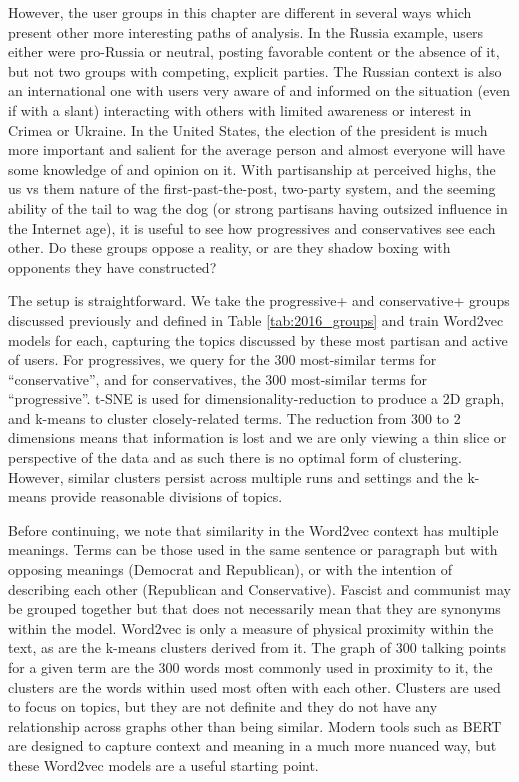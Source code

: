 \documentclass[doublespacing]{utdthesis}
\begin{document}
However, the user groups in this chapter are different in several ways which present other more interesting paths of analysis.
In the Russia example, users either were pro-Russia or neutral, posting favorable content or the absence of it, but not two groups with competing, explicit parties.
The Russian context is also an international one with users very aware of and informed on the situation (even if with a slant) interacting with others with limited awareness or interest in Crimea or Ukraine.
In the United States, the election of the president is much more important and salient for the average person and almost everyone will have some knowledge of and opinion on it.
With partisanship at perceived highs, the us vs them nature of the first-past-the-post, two-party system, and the seeming ability of the tail to wag the dog (or strong partisans having outsized influence in the Internet age), it is useful to see how progressives and conservatives see each other.
Do these groups oppose a reality, or are they shadow boxing with opponents they have constructed?

The setup is straightforward.
We take the progressive+ and conservative+ groups discussed previously and defined in Table \ref{tab:2016_groups} and train Word2vec models for each, capturing the topics discussed by these most partisan and active of users.
For progressives, we query for the 300 most-similar terms for ``conservative'', and for conservatives, the 300 most-similar terms for ``progressive''.
t-SNE is used for dimensionality-reduction to produce a 2D graph, and k-means to cluster closely-related terms.
The reduction from 300 to 2 dimensions means that information is lost and we are only viewing a thin slice or perspective of the data and as such there is no optimal form of clustering.
However, similar clusters persist across multiple runs and settings and the k-means provide reasonable divisions of topics.

Before continuing, we note that similarity in the Word2vec context has multiple meanings.
Terms can be those used in the same sentence or paragraph but with opposing meanings (Democrat and Republican), or with the intention of describing each other (Republican and Conservative).
Fascist and communist may be grouped together but that does not necessarily mean that they are synonyms within the model.
Word2vec is only a measure of physical proximity within the text, as are the k-means clusters derived from it.
The graph of 300 talking points for a given term are the 300 words most commonly used in proximity to it, the clusters are the words within used most often with each other.
Clusters are used to focus on topics, but they are not definite and they do not have any relationship across graphs other than being similar.
Modern tools such as BERT are designed to capture context and meaning in a much more nuanced way, but these Word2vec models are a useful starting point.
\end{document}
